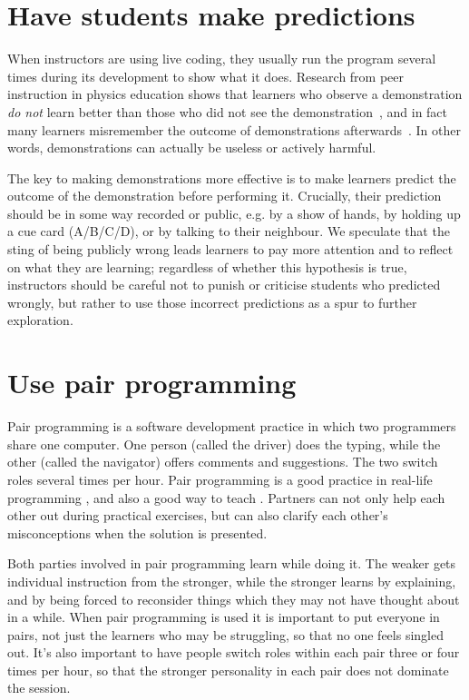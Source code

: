 \documentclass{article}
\begin{document}
\section{Have students make predictions}\label{predictions}

When instructors are using live coding, they usually run the program
several times during its development to show what it does.  Research
from peer instruction in physics education shows that learners who
observe a demonstration \textit{do not} learn better than those who
did not see the demonstration~\citep{crouch-demo}, and in fact many
learners misremember the outcome of demonstrations
afterwards~\citep{miller-demo}.  In other words, demonstrations can
actually be useless or actively harmful.

The key to making demonstrations more effective is
to make learners predict the outcome of the demonstration before performing it.
Crucially, their prediction should be in some way recorded or public,
e.g. by a show of hands,
by holding up a cue card (A/B/C/D),
or by talking to their neighbour.
We speculate that the sting of being publicly wrong leads learners to pay more attention
and to reflect on what they are learning;
regardless of whether this hypothesis is true,
instructors should be careful not to punish or criticise students who predicted wrongly,
but rather to use those incorrect predictions as a spur to further exploration.

\section{Use pair programming}\label{pair-programming}

Pair programming is a software development practice
in which two programmers share one computer.
One person (called the driver) does the typing,
while the other (called the navigator) offers comments and suggestions.
The two switch roles several times per hour.
Pair programming is a good practice in real-life programming \citep{hannay},
and also a good way to teach \citep{mcdowell}.
Partners can not only help each other out during practical exercises,
but can also clarify each other's misconceptions when the solution is presented.

Both parties involved in pair programming learn while doing it.
The weaker gets individual instruction from the stronger,
while the stronger learns by explaining,
and by being forced to reconsider things which they may not have thought about in a while.
When pair programming is used it is important to put everyone in pairs,
not just the learners who may be struggling,
so that no one feels singled out.
It's also important to have people switch roles within each pair three or four times per hour,
so that the stronger personality in each pair does not dominate the session.
\end{document}
